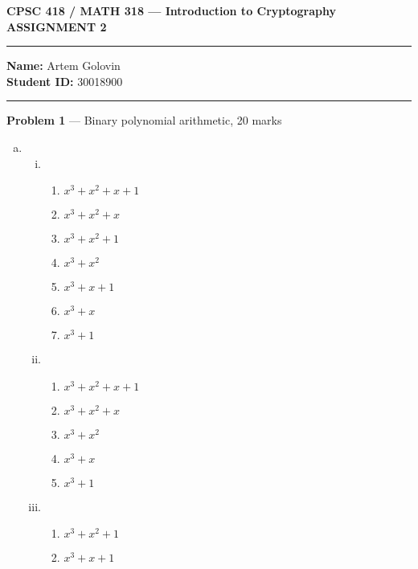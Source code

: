 \documentclass[11pt]{article}
\theoremstyle{definition}
\begin{document}
\begin{center}

  \bf \Large CPSC 418 / MATH 318 --- Introduction to Cryptography \\
  ASSIGNMENT 2

\end{center}


\medskip \hrule
  \textbf{Name:} Artem Golovin \\
  \textbf{Student ID:} 30018900
\medskip \hrule

\item[] \textbf{Problem 1} --- Binary polynomial arithmetic, 20 marks

\begin{enumerate}[a.]

  \item
    \begin{enumerate}[i. ]
      \item
        \begin{enumerate}[1. ]
          \item $x^3 + x^2 + x + 1$
          \item $x^3 + x^2 + x$
          \item $x^3 + x^2 + 1$
          \item $x^3 + x^2$
          \item $x^3 + x + 1$
          \item $x^3 + x$
          \item $x^3 + 1$ 
        \end{enumerate}

      \item
        \begin{enumerate}[1. ]
          \item $x^3 + x^2 + x + 1$
          \item $x^3 + x^2 + x$
          \item $x^3 + x^2$
          \item $x^3 + x$
          \item $x^3 + 1$ 
        \end{enumerate}

      \item
        \begin{enumerate}[1. ]
          \item $x^3 + x^2 + 1$
          \item $x^3 + x + 1$
        \end{enumerate}
    \end{enumerate}
\end{enumerate}
\end{document}
